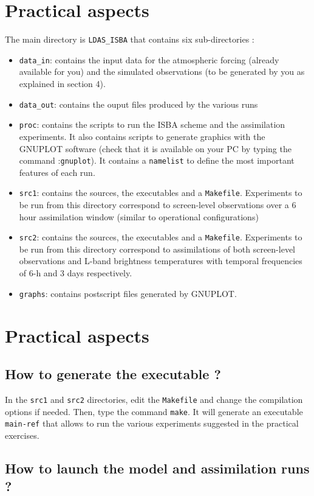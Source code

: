 \documentclass[12pt]{article}
\begin{document}
\section{Practical aspects}
The main directory is {\tt LDAS\_ISBA} that contains six
sub-directories :
\begin{itemize}
\item {\tt data\_in}: contains the input data for the atmospheric
forcing (already available for you) and the simulated observations (to be 
generated by you as explained in section 4).
\item {\tt data\_out}: contains the ouput files produced by the various
runs
\item {\tt proc}: contains the scripts to run the ISBA scheme and the
assimilation experiments. It also contains scripts to generate
graphics with the GNUPLOT software (check that it is
available on your PC by typing the command :{\tt gnuplot}). 
It contains a {\tt namelist} to define the most
important features of each run.
\item {\tt src1}: contains the sources, the executables and a {\tt Makefile}.
Experiments to be run from this directory correspond to screen-level observations
over a 6 hour assimilation window (similar to operational configurations)
\item {\tt src2}: contains the sources, the executables and a {\tt Makefile}.
Experiments to be run from this directory correspond to assimilations of both
screen-level observations and L-band brightness temperatures with
temporal frequencies of 6-h and 3 days respectively.
\item{\tt graphs}: contains postscript files generated by GNUPLOT.
\end{itemize}
\section{Practical aspects}
\subsection{How to generate the executable ?}
In the {\tt src1} and {\tt src2} directories, edit the 
{\tt Makefile} and change the compilation options if needed. Then, type the command
{\tt make}. It will generate an executable {\tt main-ref} that allows to run the various
experiments suggested in the practical exercises.
\subsection{How to launch the model and assimilation runs ?}
\end{document}
